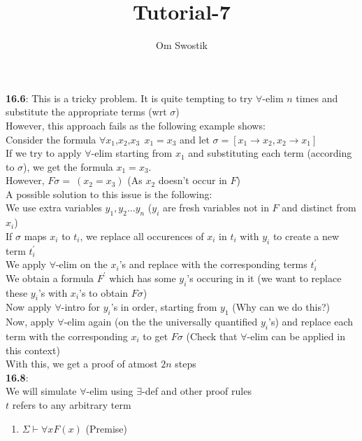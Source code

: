 \documentclass{article}
\title{Tutorial-7}
\author{Om Swostik}
\date{}
\begin{document}
\maketitle
\begin{flushleft}
\textbf{16.6}: This is a tricky problem. It is quite tempting to try $\forall$-elim $n$ times and substitute the appropriate terms (wrt $\sigma$)\\
However, this approach fails as the following example shows:\\       
Consider the formula $\forall x_1\text{,}x_2\text{,}x_3\:\: x_1=x_3$ and let $\sigma= [x_1\rightarrow x_2,x_2\rightarrow x_1]$\\
If we try to apply $\forall$-elim starting from $x_1$ and substituting each term (according to $\sigma$), we get the formula $x_1=x_3$.\\
However, $F\sigma= \:(x_2=x_3)$  (As $x_2$ doesn't occur in $F$)\\
A possible solution to this issue is the following: \\
We use extra variables $y_1,y_2\dots y_n$  ($y_i$ are fresh variables not in $F$ and distinct from $x_i$)\\
If $\sigma$ maps $x_i$ to $t_i$, we replace all occurences of $x_i$ in $t_i$ with $y_i$ to create a new term $t_i^{'}$\\
We apply $\forall$-elim on the $x_i$'s and replace with the corresponding terms $t_i^{'}$\\
We obtain a formula $F^{'}$ which has some $y_i$'s occuring in it (we want to replace these $y_i$'s with $x_i$'s to obtain $F\sigma$)\\
Now apply $\forall$-intro for $y_i$'s in order, starting from $y_1$ (Why can we do this?)\\
Now, apply $\forall$-elim again (on the the universally quantified $y_i$'s) and replace each term with the corresponding $x_i$ to get $F\sigma$ (Check that $\forall$-elim can be applied in this context)\\
With this, we get a proof of atmost $2n$ steps\\
\textbf{16.8}: \\
We will simulate $\forall$-elim using $\exists$-def and other proof rules\\
$t$ refers to any arbitrary term \\
\begin{enumerate}
    \item $\Sigma \vdash \forall x F(x)$ \hspace{2mm} (Premise)

\end{enumerate}
\end{flushleft}
\end{document}
